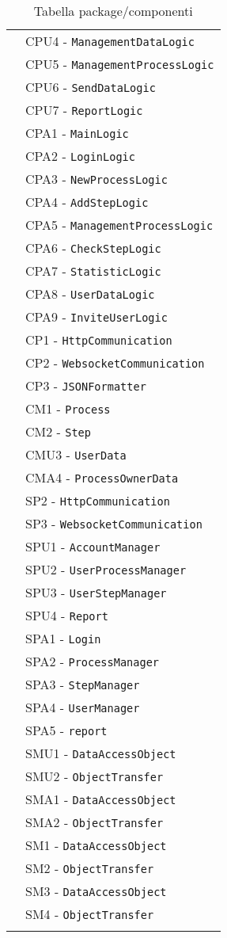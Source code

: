 \begin{longtable}{XX}
&CPU4 - \texttt{ManagementDataLogic}\\
&CPU5 - \texttt{ManagementProcessLogic}\\
&CPU6 - \texttt{SendDataLogic}\\
&CPU7 - \texttt{ReportLogic}\\
\midrule
\logicAdmin{}&CPA1 - \texttt{MainLogic}\\
&CPA2 - \texttt{LoginLogic}\\
&CPA3 - \texttt{NewProcessLogic}\\
&CPA4 - \texttt{AddStepLogic}\\
&CPA5 - \texttt{ManagementProcessLogic}\\
&CPA6 - \texttt{CheckStepLogic}\\
&CPA7 - \texttt{StatisticLogic}\\
&CPA8 - \texttt{UserDataLogic}\\
&CPA9 - \texttt{InviteUserLogic}\\
\midrule
\serverCommunication{}&CP1 - \texttt{HttpCommunication}\\
&CP2 - \texttt{WebsocketCommunication}\\
&CP3 - \texttt{JSONFormatter}\\
\midrule
\model{}&CM1 - \texttt{Process}\\
&CM2 - \texttt{Step}\\
\midrule
\modelUser{}&CMU3 - \texttt{UserData}\\
\midrule
\modelAdmin{}&CMA4 - \texttt{ProcessOwnerData}\\
\midrule
\sCommunication{}&SP2 - \texttt{HttpCommunication}\\
&SP3 - \texttt{WebsocketCommunication}\\
\midrule
\sLogicUser{}&SPU1 - \texttt{AccountManager}\\
&SPU2 - \texttt{UserProcessManager}\\
&SPU3 - \texttt{UserStepManager}\\
&SPU4 - \texttt{Report}\\
\midrule
\sLogicAdmin{}&SPA1 - \texttt{Login}\\
&SPA2 - \texttt{ProcessManager}\\
&SPA3 - \texttt{StepManager}\\
&SPA4 - \texttt{UserManager}\\
&SPA5 - \texttt{report}\\
\midrule
\daoUser{}&SMU1 - \texttt{DataAccessObject}\\
&SMU2 - \texttt{ObjectTransfer}\\
\midrule
\daoAdmin{}&SMA1 - \texttt{DataAccessObject}\\
&SMA2 - \texttt{ObjectTransfer}\\
\midrule
\daoProcess{}&SM1 - \texttt{DataAccessObject}\\
&SM2 - \texttt{ObjectTransfer}\\
\midrule
\daoStep{}&SM3 - \texttt{DataAccessObject}\\
&SM4 - \texttt{ObjectTransfer}\\
\bottomrule
\caption{Tabella package/componenti}
\end{longtable}